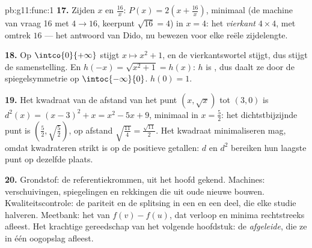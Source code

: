 \begin{solution}{pb:g11:func:1}
\textbf{17.} Zijden $x$ en $\frac{16}{x}$:
$P(x) = 2\left(x + \frac{16}{x}\right)$, minimaal (de machine van vraag 16
met $4 \to 16$, keerpunt $\sqrt{16} = 4$) in $x = 4$: het \emph{vierkant}
$4 \times 4$, met omtrek $16$ --- het antwoord van Dido, nu bewezen voor elke
reële zijdelengte.

\textbf{18.} Op $\intco{0}{+\infty}$ stijgt $x \mapsto x^2 + 1$, en de
vierkantswortel stijgt, dus stijgt de samenstelling. En
$h(-x) = \sqrt{x^2 + 1} = h(x)$: $h$ is , dus daalt ze door de
spiegelsymmetrie op $\intoc{-\infty}{0}$.  $h(0) = 1$.

\textbf{19.} Het kwadraat van de afstand van het punt $(x, \sqrt x)$ tot
$(3, 0)$ is $d^2(x) = (x - 3)^2 + x = x^2 - 5x + 9$, minimaal in
$x = \frac52$: het dichtstbijzijnde punt is
$\left(\frac52, \sqrt{\frac52}\right)$, op afstand
$\sqrt{\frac{11}{4}} = \frac{\sqrt{11}}{2}$. Het kwadraat minimaliseren mag,
omdat kwadrateren strikt  is op de positieve getallen: $d$ en $d^2$
bereiken hun laagste punt op dezelfde plaats.

\textbf{20.} Grondstof: de referentiekrommen, uit het hoofd gekend.
Machines: verschuivingen, spiegelingen en rekkingen die uit oude 
nieuwe bouwen. Kwaliteitscontrole: de pariteit en de splitsing in een 
en een  deel, die elke studie halveren. Meetbank: het  van
$f(v) - f(u)$, dat verloop en minima rechtstreeks afleest. Het krachtige
gereedschap van het volgende hoofdstuk: de \emph{afgeleide}, die ze in één
oogopslag afleest.
\end{solution}
